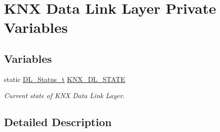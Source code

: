 \hypertarget{group___k_n_x___d_l___private___variables}{}\section{K\+NX Data Link Layer Private Variables}
\label{group___k_n_x___d_l___private___variables}
\subsection*{Variables}
\begin{DoxyCompactItemize}
\item 
static \hyperlink{group___k_n_x___d_l___exported___types_ga143539be3680d9b7f990a9dfe1df40fe}{D\+L\+\_\+\+Status\+\_\+t} \hyperlink{group___k_n_x___d_l___private___variables_gacea80ec8cf0e99ebe15e3205b7d273a9}{K\+N\+X\+\_\+\+D\+L\+\_\+\+S\+T\+A\+TE}\hypertarget{group___k_n_x___d_l___private___variables_gacea80ec8cf0e99ebe15e3205b7d273a9}{}\label{group___k_n_x___d_l___private___variables_gacea80ec8cf0e99ebe15e3205b7d273a9}

\begin{DoxyCompactList}\small\item\em Current state of K\+NX Data Link Layer. \end{DoxyCompactList}\end{DoxyCompactItemize}


\subsection{Detailed Description}
